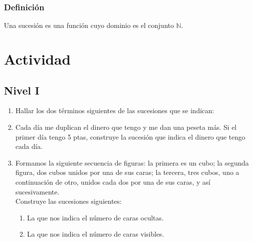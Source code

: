 \documentclass{article}
\begin{document}
\subsubsection*{Definici\'{o}n}
Una sucesi\'{o}n es una función cuyo dominio es el conjunto $\mathbb{N}$.
\section*{Actividad}
\subsection*{Nivel I}
\begin{enumerate}
\item Hallar los dos términos siguientes de las sucesiones que se indican:
\begin{enumerate}
\end{enumerate}
\item Cada día me duplican el dinero que tengo y me dan una peseta más. Si el primer día tengo 5 ptas, construye la sucesión que indica el dinero que tengo cada día.
\item Formamos la siguiente secuencia de figuras: la primera es un cubo; la segunda figura, dos cubos unidos por una de sus caras; la tercera, tres cubos, uno a continuación de otro, unidos cada dos por una de sus caras, y así sucesivamente.\\
Construye las sucesiones siguientes:
\begin{enumerate}
\item La que nos indica el número de caras ocultas.
\item La que nos indica el número de caras visibles.\\

\end{enumerate}
\end{enumerate}
\end{document}
